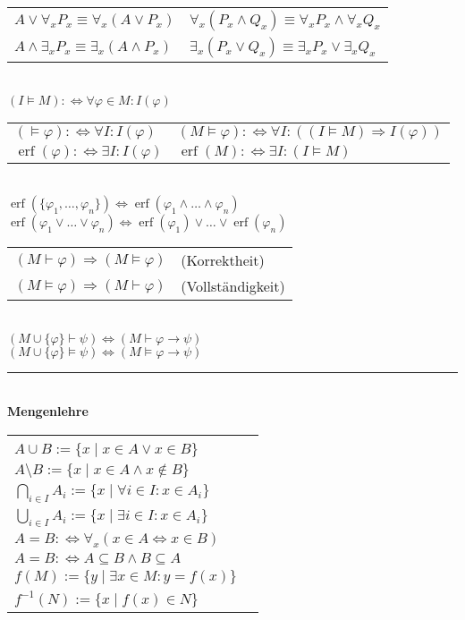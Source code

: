 \documentclass[a4paper,10pt,fleqn,twoside,twocolumn,dvipdfmx]{scrartcl}
\newcommand{\erf}{\operatorname{erf}}
\newcommand{\strong}[1]{\textsf{\textbf{#1}}}
\begin{document}
\noindent
\begin{tabular}{@{}l|l}
$A\lor\forall_{\!x} P_x \equiv \forall_{\!x}(A\lor P_x)$
&$\forall_{\!x}(P_x\land Q_x) \equiv \forall_{\!x}P_x\land\forall_{\!x}Q_x$\\
$A\land\exists_x P_x \equiv \exists_x(A\land P_x)$
&$\exists_{x}(P_x\lor Q_x) \equiv \exists_x P_x\lor\exists_x Q_x$
\end{tabular}\\
$(I\models M) :\Leftrightarrow \forall\varphi{\in}M\colon I(\varphi)$\\
\begin{tabular}{@{}l|l}
$(\models\varphi) :\Leftrightarrow \forall I\colon I(\varphi)$
& $(M\models\varphi) :\Leftrightarrow \forall I\colon ((I\models M)\Rightarrow I(\varphi))$\\
$\erf(\varphi) :\Leftrightarrow \exists I\colon I(\varphi)$
& $\erf(M) :\Leftrightarrow \exists I\colon (I\models M)$
\end{tabular}\\
$\erf(\{\varphi_1,\ldots,\varphi_n\}) \Leftrightarrow
\erf(\varphi_1\land\ldots\land\varphi_n)$\\
$\erf(\varphi_1\lor\ldots\lor\varphi_n) \Leftrightarrow
\erf(\varphi_1)\lor\ldots\lor\erf(\varphi_n)$\\
\begin{tabular}{@{}ll}
$(M\vdash\varphi)\Rightarrow (M\models\varphi)$ & (Korrektheit)\\
$(M\models\varphi)\Rightarrow (M\vdash\varphi)$ & (Vollständigkeit)
\end{tabular}\\
$(M\cup\{\varphi\}\vdash\psi)\Leftrightarrow (M\vdash \varphi\rightarrow\psi)$\\
$(M\cup\{\varphi\}\models\psi)\Leftrightarrow (M\models \varphi\rightarrow\psi)$\\[-4pt]
\rule{\columnwidth}{\heavyrulewidth}\\
\strong{Mengenlehre}\\[2pt]
\begin{tabular}{@{}l@{\;\,}|@{\;\;}l}
\makecell[lt]{
$A\cap B := \{x\mid x\in A\land x\in B\}$\\
$A\cup B := \{x\mid x\in A\lor x\in B\}$\\
$A\setminus B := \{x\mid x\in A\land x\notin B\}$\\
$\bigcap_{i\in I} A_i := \{x\mid \forall i{\in}I\colon x{\in}A_i\}$\\
$\bigcup_{i\in I} A_i := \{x\mid \exists i{\in}I\colon x{\in}A_i\}$
}
&\makecell[lt]{
$A\subseteq B :\Leftrightarrow \forall_{\!x}(x\in A\Rightarrow x\in B)$\\
$A=B :\Leftrightarrow \forall_{\!x}(x\in A\Leftrightarrow x\in B)$\\
$A=B :\Leftrightarrow A\subseteq B\land B\subseteq A$\\
$f(M) := \{y\mid\exists x{\in}M\colon y{=}f(x)\}$\\
$f^{-1}(N) := \{x\mid f(x)\in N\}$
}
\end{tabular}\\
\end{document}
